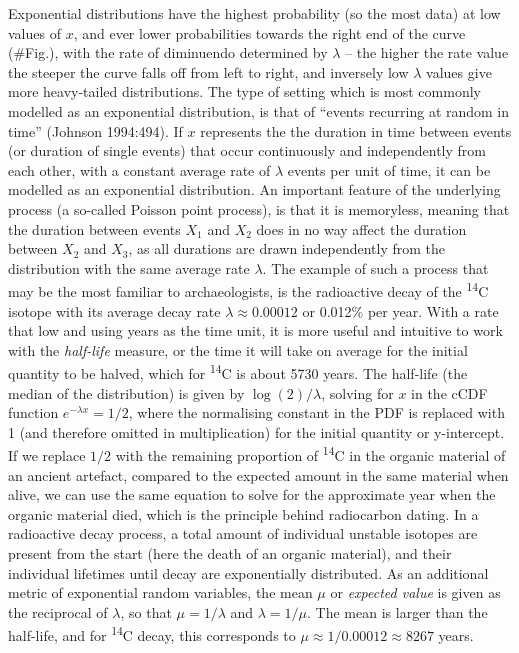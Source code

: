 \documentclass[
  12pt,
]{book}
\begin{document}
Exponential distributions have the highest probability (so the most data) at low values of \(x\), and ever lower probabilities towards the right end of the curve (\#Fig.), with the rate of diminuendo determined by \(\lambda\) -- the higher the rate value the steeper the curve falls off from left to right, and inversely low \(\lambda\) values give more heavy-tailed distributions. The type of setting which is most commonly modelled as an exponential distribution, is that of ``events recurring at random in time'' (Johnson 1994:494). If \(x\) represents the the duration in time between events (or duration of single events) that occur continuously and independently from each other, with a constant average rate of \(\lambda\) events per unit of time, it can be modelled as an exponential distribution. An important feature of the underlying process (a so-called Poisson point process), is that it is memoryless, meaning that the duration between events \(X_1\) and \(X_2\) does in no way affect the duration between \(X_2\) and \(X_3\), as all durations are drawn independently from the distribution with the same average rate \(\lambda\). The example of such a process that may be the most familiar to archaeologists, is the radioactive decay of the \textsuperscript{14}C isotope with its average decay rate \(\lambda \approx 0.00012\) or 0.012\% per year. With a rate that low and using years as the time unit, it is more useful and intuitive to work with the \emph{half-life} measure, or the time it will take on average for the initial quantity to be halved, which for \textsuperscript{14}C is about 5730 years. The half-life (the median of the distribution) is given by \(\log (2)/\lambda\), solving for \(x\) in the cCDF function \(e^{-\lambda x} = 1/2\), where the normalising constant in the PDF is replaced with 1 (and therefore omitted in multiplication) for the initial quantity or y-intercept. If we replace \(1/2\) with the remaining proportion of \textsuperscript{14}C in the organic material of an ancient artefact, compared to the expected amount in the same material when alive, we can use the same equation to solve for the approximate year when the organic material died, which is the principle behind radiocarbon dating. In a radioactive decay process, a total amount of individual unstable isotopes are present from the start (here the death of an organic material), and their individual lifetimes until decay are exponentially distributed. As an additional metric of exponential random variables, the mean \(\mu\) or \emph{expected value} is given as the reciprocal of \(\lambda\), so that \(\mu = 1/\lambda\) and \(\lambda = 1/\mu\). The mean is larger than the half-life, and for \textsuperscript{14}C decay, this corresponds to \(\mu \approx 1/0.00012 \approx 8267\) years.
\end{document}
